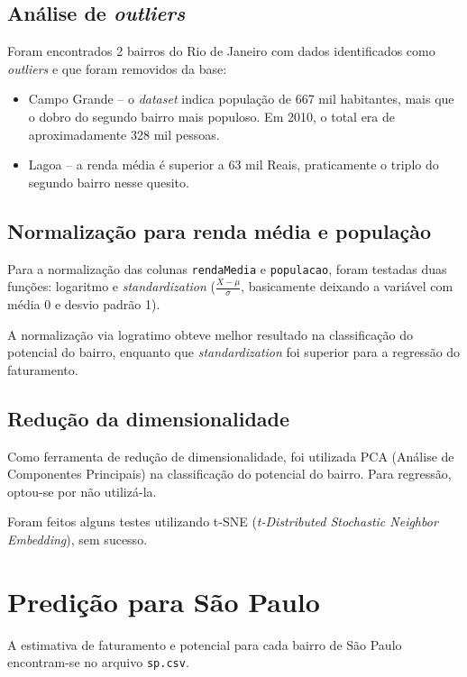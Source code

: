 \documentclass[10pt, a4paper]{article}
\begin{document}
\subsection{Análise de \emph{outliers}}

Foram encontrados 2 bairros do Rio de Janeiro com dados identificados
como \emph{outliers} e que foram removidos da base:

\begin{itemize}
\item Campo Grande -- o \emph{dataset} indica população de 667 mil
  habitantes, mais que o dobro do segundo bairro mais populoso. Em
  2010, o total era de aproximadamente 328 mil pessoas.
\item Lagoa -- a renda média é superior a 63 mil Reais, praticamente o
  triplo do segundo bairro nesse quesito.
\end{itemize}

\subsection{Normalização para renda média e populaçào}

Para a normalização das colunas \texttt{rendaMedia} e
\texttt{populacao}, foram testadas duas funções: logaritmo e
\emph{standardization} ($\frac{X - \mu}{\sigma}$, basicamente deixando
a variável com média 0 e desvio padrão 1). 

A normalização via logratimo obteve melhor resultado na classificação
do potencial do bairro, enquanto que \emph{standardization} foi
superior para a regressão do faturamento.

\subsection{Redução da dimensionalidade}

Como ferramenta de redução de dimensionalidade, foi utilizada PCA
(Análise de Componentes Principais) na classificação do potencial do
bairro. Para regressão, optou-se por não utilizá-la.

Foram feitos alguns testes utilizando t-SNE (\emph{t-Distributed
  Stochastic Neighbor Embedding}), sem sucesso.

\section{Predição para São Paulo}

A estimativa de faturamento e potencial para cada bairro de São Paulo
encontram-se no arquivo \texttt{sp.csv}.
\end{document}
